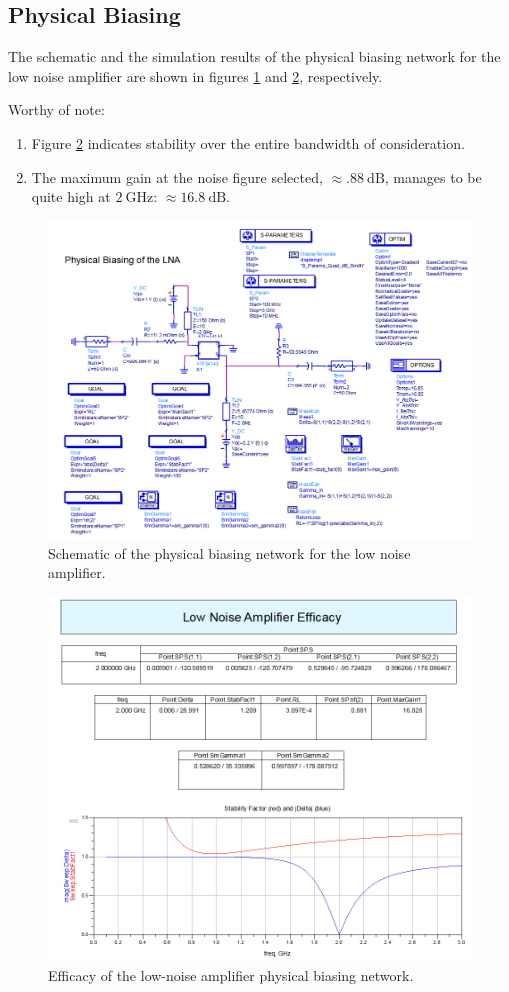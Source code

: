 \subsection{Physical Biasing}

The schematic and the simulation results of the physical biasing network for the
low noise amplifier are shown in figures \ref{fig:A2P2PhysicalSchematic} and
\ref{fig:A2P2PhysicalResults}, respectively.

Worthy of note: 
\begin{enumerate}
    \item   Figure \ref{fig:A2P2PhysicalResults} indicates stability over the
        entire bandwidth of consideration.
    \item   The maximum gain at the noise figure selected, $\approx
        \SI{.88}{\deci\bel}$, manages to be quite high at $\SI{2}{\giga\hertz}$:
        $\approx \SI{16.8}{\deci\bel}$.
\end{enumerate}

\begin{figure}[H]
    \centering
    \includegraphics[width=0.8\linewidth]{Images/A2P2PhysicalSchematic.png}
    \caption{Schematic of the physical biasing network for the low noise
    amplifier.}
    \label{fig:A2P2PhysicalSchematic}
\end{figure}

\begin{figure}[H]
    \centering
    \includegraphics[width=0.8\linewidth]{Images/A2P2PhysicalResults.png}
    \caption{Efficacy of the low-noise amplifier physical biasing network.}
    \label{fig:A2P2PhysicalResults}
\end{figure}

